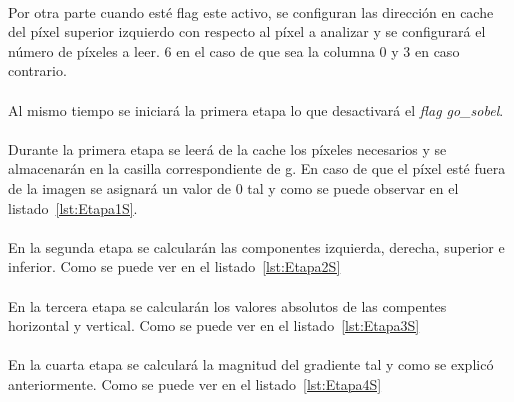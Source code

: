 \documentclass[a4paper,12pt,titlepage,final]{book}
\begin{document}


\paragraph{}
Por otra parte cuando esté flag este activo, se configuran las dirección en cache del píxel superior izquierdo con respecto al píxel a analizar y se configurará el número de píxeles a leer. 6 en el caso de que sea la columna 0 y 3 en caso contrario.

\paragraph{}
Al mismo tiempo se iniciará la primera etapa lo que desactivará el \textit{flag go\_sobel}.

\paragraph{}
Durante la primera etapa se leerá de la cache los píxeles necesarios y se almacenarán en la casilla correspondiente de g. En caso de que el píxel esté fuera de la imagen se asignará un valor de 0 tal y como se puede observar en el listado~\ref{lst:Etapa1S}.



\paragraph{}
En la segunda etapa se calcularán las componentes izquierda, derecha, superior e inferior. Como se puede ver en el listado~\ref{lst:Etapa2S}



\paragraph{}
En la tercera etapa se calcularán los valores absolutos de las compentes horizontal y vertical. Como se puede ver en el listado~\ref{lst:Etapa3S}



\paragraph{}
En la cuarta etapa se calculará la magnitud del gradiente tal y como se explicó anteriormente. Como se puede ver en el listado~\ref{lst:Etapa4S}
\end{document}
